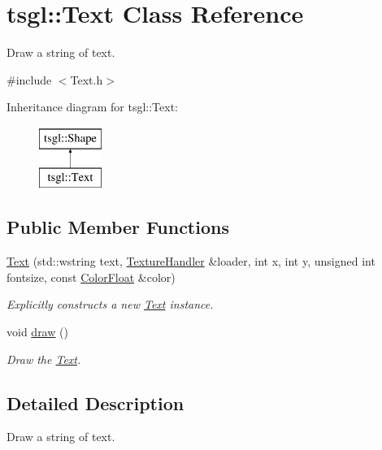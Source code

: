\hypertarget{classtsgl_1_1_text}{\section{tsgl\-:\-:\-Text \-Class \-Reference}
\label{classtsgl_1_1_text}
}


\-Draw a string of text.  




{\ttfamily \#include $<$\-Text.\-h$>$}

\-Inheritance diagram for tsgl\-:\-:\-Text\-:\begin{figure}[H]
\begin{center}
\leavevmode
\includegraphics[height=2.000000cm]{classtsgl_1_1_text}
\end{center}
\end{figure}
\subsection*{\-Public \-Member \-Functions}
\begin{DoxyCompactItemize}
\item 
\hyperlink{classtsgl_1_1_text_ad1a6a77a4762f4420527457a7a5c24e7}{\-Text} (std\-::wstring text, \hyperlink{classtsgl_1_1_texture_handler}{\-Texture\-Handler} \&loader, int x, int y, unsigned int fontsize, const \hyperlink{structtsgl_1_1_color_float}{\-Color\-Float} \&color)
\begin{DoxyCompactList}\small\item\em \-Explicitly constructs a new \hyperlink{classtsgl_1_1_text}{\-Text} instance. \end{DoxyCompactList}\item 
void \hyperlink{classtsgl_1_1_text_a9dc47e4af682abfdab74e37b71f9fbde}{draw} ()
\begin{DoxyCompactList}\small\item\em \-Draw the \hyperlink{classtsgl_1_1_text}{\-Text}. \end{DoxyCompactList}\end{DoxyCompactItemize}


\subsection{\-Detailed \-Description}
\-Draw a string of text. 

